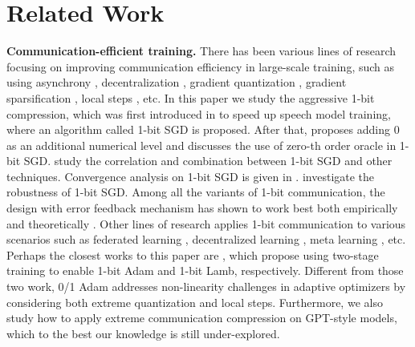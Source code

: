 \section{Related Work}
\label{sec:related work}
\textbf{Communication-efficient training.}
There has been various lines of research focusing on improving communication efficiency in large-scale training, such as using asynchrony \citep{niu2011hogwild,lian2015asynchronous,xie2020zeno++}, decentralization \citep{lian2017can,lu2021optimal}, gradient quantization \citep{alistarh2017qsgd,wen2017terngrad}, gradient sparsification \citep{wangni2017gradient,wang2018atomo}, local steps \citep{stich2018local,lin2018don}, etc. 
In this paper we study the aggressive 1-bit compression, which was first introduced in \citep{seide20141} to speed up speech model training, where an algorithm called 1-bit SGD is proposed. After that, \citet{wen2017terngrad} proposes adding 0 as an additional numerical level and \citet{liu2018signsgd} discusses the use of zero-th order oracle in 1-bit SGD. \citet{chen2019distributed,balles2018dissecting,xu2019signprox} study the correlation and combination between 1-bit SGD and other techniques. Convergence analysis on 1-bit SGD is given in \citep{bernstein2018signsgd,karimireddy2019error,safaryan2021stochastic}. 
\citet{bernstein2018signsgd2,sohn2019election,le2020distributed,lyu2021dp} investigate the robustness of 1-bit SGD.
Among all the variants of 1-bit communication, the design with error feedback mechanism has shown to work best both empirically \citep{seide20141} and theoretically \citep{karimireddy2019error}.
Other lines of research applies 1-bit communication to various scenarios such as federated learning \citep{jin2020stochastic,yue2021federated}, decentralized learning \citep{lu2020moniqua,koloskova2019decentralized}, meta learning \citep{fan2021sign}, etc. Perhaps the closest works to this paper are \citep{tang20211,li20211}, which propose using two-stage training to enable 1-bit Adam and 1-bit Lamb, respectively. Different from those two work, 0/1 Adam addresses non-linearity challenges in adaptive optimizers by considering both extreme quantization and local steps. Furthermore, we also study how to apply extreme communication compression on GPT-style models, which to the best our knowledge is still under-explored.  

